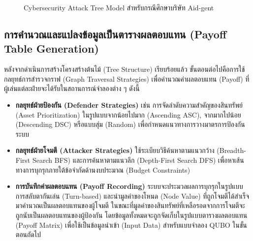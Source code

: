 \begin{figure}[htbp]
{
}
\caption{Cybersecurity Attack Tree Model สำหรับกรณีศึกษาบริษัท Aid-gent}
\label{figtree}
\end{figure}

\subsection{การคำนวณและแปลงข้อมูลเป็นตารางผลตอบแทน (Payoff Table Generation)}
หลังจากดำเนินการสร้างโครงสร้างต้นไม้ (Tree Structure) เรียบร้อยแล้ว ขั้นตอนต่อไปคือการใช้กลยุทธ์การสำรวจกราฟ (Graph Traversal Strategies) เพื่อคำนวณค่าผลตอบแทน (Payoff) ที่ผู้เล่นแต่ละฝ่ายจะได้รับในสถานการณ์จำลองต่าง ๆ ดังนี้

\begin{itemize}
    \item \textbf{กลยุทธ์ฝ่ายป้องกัน (Defender Strategies)} เช่น การจัดลำดับความสำคัญของสินทรัพย์ (Asset Prioritization) ในรูปแบบจากน้อยไปมาก (Ascending ASC), จากมากไปน้อย (Descending DSC) หรือแบบสุ่ม (Random) เพื่อกำหนดแนวทางการวางมาตรการป้องกันระบบ
    \item \textbf{กลยุทธ์ฝ่ายโจมตี (Attacker Strategies)} ใช้ระเบียบวิธีค้นหาตามแนวกว้าง (Breadth-First Search BFS) และการค้นหาตามแนวลึก (Depth-First Search DFS) เพื่อหาเส้นทางการบุกรุกภายใต้ข้อจำกัดด้านงบประมาณ (Budget Constraints)
    \item \textbf{การบันทึกค่าผลตอบแทน (Payoff Recording)} ระบบจะประมวลผลการบุกรุกในรูปแบบการสลับตากันเล่น (Turn-based) และนำมูลค่าของโหนด (Node Value) ที่ถูกโจมตีได้สำเร็จมาคำนวณเป็นผลตอบแทนของผู้โจมตี ในขณะที่มูลค่าของสินทรัพย์ที่เหลือรอดจากการโจมตีจะถูกนับเป็นผลตอบแทนของผู้ป้องกัน โดยข้อมูลทั้งหมดจะถูกจัดเก็บในรูปแบบตารางผลตอบแทน (Payoff Matrix) เพื่อใช้เป็นข้อมูลนำเข้า (Input Data) สำหรับแบบจำลอง QUBO ในขั้นตอนถัดไป
\end{itemize}


